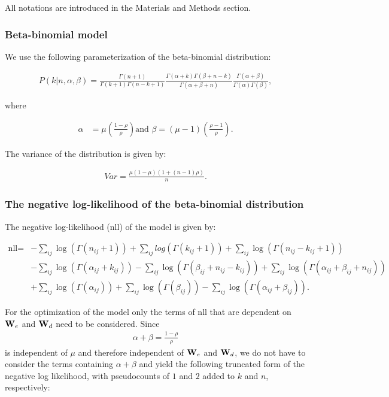 All notations are introduced in the Materials and Methods section.

\subsubsection*{Beta-binomial model}

We use the following parameterization of the beta-binomial distribution:

\begin{align*}
P(k| n, \alpha, \beta) = \frac{\Gamma(n+1)}{\Gamma(k+1)\Gamma(n-k+1)} 
\frac{\Gamma(\alpha + k)\Gamma(\beta + n - k)}{\Gamma(\alpha + \beta + n)}
\frac{\Gamma(\alpha + \beta)}{\Gamma(\alpha)\Gamma(\beta)},
\end{align*}

where 

\begin{align*}
\alpha &= \mu \left(\frac{1-\rho}{\rho}\right) \text{and } \beta = (\mu - 1)\left(\frac{\rho - 1}{\rho}\right).
\end{align*}

The variance of the distribution is given by:

\begin{align*}
Var = \frac{\mu (1 - \mu) (1 + (n-1)\rho )}{n}.
\end{align*}


\subsubsection*{The negative log-likelihood of the beta-binomial distribution}

The negative log-likelihood ($\text{nll}$) of the model is given by:

\begin{align*}
\text{nll}=& - \sum_{ij}\log( \Gamma(n_{ij}+1)) + \sum_{ij}log(\Gamma(k_{ij}+1)) + \sum_{ij}\log(\Gamma(n_{ij}-k_{ij}+1)) \\
&- \sum_{ij}\log(\Gamma(\alpha_{ij}+k_{ij})) - \sum_{ij}\log(\Gamma(\beta_{ij}+n_{ij}-k_{ij})) + \sum_{ij}\log(\Gamma(\alpha_{ij} + \beta_{ij} + n_{ij})) \\
&+ \sum_{ij}\log(\Gamma(\alpha_{ij})) + \sum_{ij}\log(\Gamma(\beta_{ij})) - \sum_{ij}\log(\Gamma(\alpha_{ij} + \beta_{ij})).
\end{align*}


For the optimization of the model only the terms of $\text{nll}$
that are dependent on $\mathbf{W}_e$ and $\mathbf{W}_d$ need to be considered. 
Since
\begin{align*}
\alpha + \beta = \frac{1-\rho}{\rho}
\end{align*}
is independent of $\mu$ and therefore independent of $\mathbf{W}_e$ and $\mathbf{W}_d$,
we do not have to consider the terms containing $\alpha + \beta$ and yield the 
following truncated form of the negative log likelihood, with pseudocounts of 
$1$ and $2$ added to $k$ and $n$, respectively:

